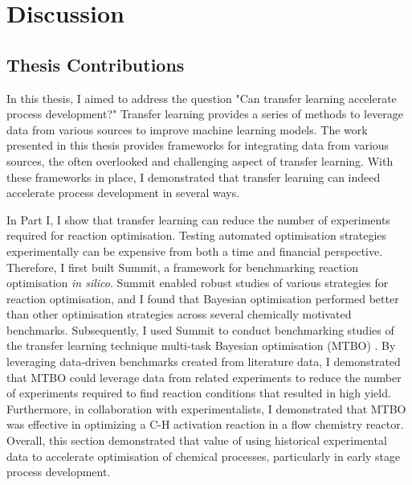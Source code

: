 \chapter{Discussion}\label{ch:discussion} 

\section{Thesis Contributions}

In this thesis, I aimed to address the question "Can transfer learning accelerate process development?"  Transfer learning provides a series of methods to leverage data from various sources to improve machine learning models. The work presented in this thesis provides frameworks for integrating data from various sources, the often overlooked and challenging aspect of transfer learning. With these frameworks in place, I demonstrated that transfer learning can indeed accelerate process development in several ways. 

In Part I, I show that transfer learning can reduce the number of experiments required for reaction optimisation. Testing automated optimisation strategies experimentally can be expensive from both a time and financial perspective.  Therefore, I first built Summit, a framework for benchmarking reaction optimisation \textit{in silico}. Summit enabled robust studies of various strategies for reaction optimisation, and I found that Bayesian optimisation performed better than other optimisation strategies across several chemically motivated benchmarks. Subsequently, I used Summit to conduct benchmarking studies of the transfer learning technique multi-task Bayesian optimisation (MTBO) \cite{Swersky2013}. By leveraging data-driven benchmarks created from literature data, I demonstrated that MTBO could leverage data from related experiments to reduce the number of experiments required to find reaction conditions that resulted in high yield. Furthermore, in collaboration with experimentalists, I demonstrated that MTBO was effective in optimizing a C-H activation reaction in a flow chemistry reactor.  Overall, this section demonstrated that value of using historical experimental data to accelerate optimisation of chemical processes, particularly in early stage process development.


